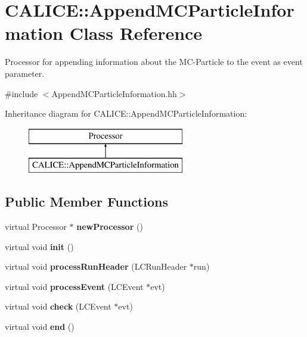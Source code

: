 \section{C\-A\-L\-I\-C\-E\-:\-:Append\-M\-C\-Particle\-Information Class Reference}
\label{classCALICE_1_1AppendMCParticleInformation}


Processor for appending information about the M\-C-\/\-Particle to the event as event parameter.  




{\ttfamily \#include $<$Append\-M\-C\-Particle\-Information.\-hh$>$}

Inheritance diagram for C\-A\-L\-I\-C\-E\-:\-:Append\-M\-C\-Particle\-Information\-:\begin{figure}[H]
\begin{center}
\leavevmode
\includegraphics[height=2.000000cm]{classCALICE_1_1AppendMCParticleInformation}
\end{center}
\end{figure}
\subsection*{Public Member Functions}
\begin{DoxyCompactItemize}
\item 
virtual Processor $\ast$ {\bfseries new\-Processor} ()\label{classCALICE_1_1AppendMCParticleInformation_a960af39ab4aec5c86924c8d0ced063dc}

\item 
virtual void {\bf init} ()
\item 
virtual void {\bf process\-Run\-Header} (L\-C\-Run\-Header $\ast$run)
\item 
virtual void {\bf process\-Event} (L\-C\-Event $\ast$evt)
\item 
virtual void {\bfseries check} (L\-C\-Event $\ast$evt)\label{classCALICE_1_1AppendMCParticleInformation_accaf96eba448c6c9005f329e8d1aa10c}

\item 
virtual void {\bf end} ()
\end{DoxyCompactItemize}
